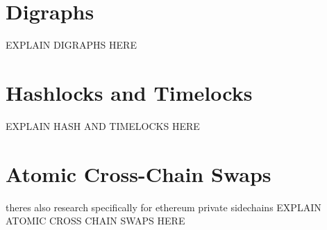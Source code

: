 

%
%
\section{Digraphs}
\label{sec:background:second_section}
EXPLAIN DIGRAPHS HERE
\cite{bang2007theory}

\section{Hashlocks and Timelocks}
\label{sec:background:third_section}
EXPLAIN HASH AND TIMELOCKS HERE


\section{Atomic Cross-Chain Swaps}
\label{sec:background:fifth_section}

theres also research specifically for ethereum private sidechains \cite{robinson2019atomic}
EXPLAIN ATOMIC CROSS CHAIN SWAPS HERE
\cite{herlihy2018atomic}